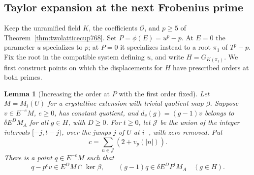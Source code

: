 \documentclass[a4paper,11pt]{article}
\newtheorem{lemma}[proposition]{Lemma}
\theoremstyle{definition}
\theoremstyle{remark}
\numberwithin{equation}{section}
\begin{document}
\subsection{Taylor expansion at the next Frobenius prime}
\label{sec:nexttaylormixed772}
Keep the unramified field \(K\), the coefficients
\(\mathcal O\), and \(p\ge5\) of
Theorem~\ref{thm:twolatticecup768}. Set \(P=\phi(E)=u^p-p\).
At \(E=0\) the parameter \(u\) specializes to \(p\); at
\(P=0\) it specializes instead to a root \(\pi_1\) of
\(T^p-p\). Fix the root in the compatible system defining
\(u\), and write \(H=G_{K(\pi_1)}\). We first construct
points on which the displacements for \(H\) have prescribed
orders at both primes.

\begin{lemma}[Increasing the order at \(P\) with the first order fixed]
\leavevmode\label{lem:nextjet772}
Let \(M=M_i(U)\) for a crystalline extension with trivial
quotient map \(\beta\). Suppose \(v\in E^{-e}M\), \(e\ge0\),
has constant quotient, and \(d_v(g)=(g-1)v\) belongs to
\(\delta E^D M_A\) for all \(g\in H\), with \(D\ge0\).
For \(t\ge0\), let \(\mathcal J\) be the union of the
integer intervals \([-j,t-j)\), over the jumps \(j\) of
\(U\) at \(i^-\), with zero removed. Put
\[
              c=\sum_{n\in\mathcal J}(2+v_p(|n|)).
\]
There is a point \(q\in E^{-e}M\) such that
\[
 q-p^c v\in E^D M\cap\ker\beta,\qquad
       (g-1)q\in\delta E^D P^t M_A\quad(g\in H).
\]
\end{lemma}
\end{document}
